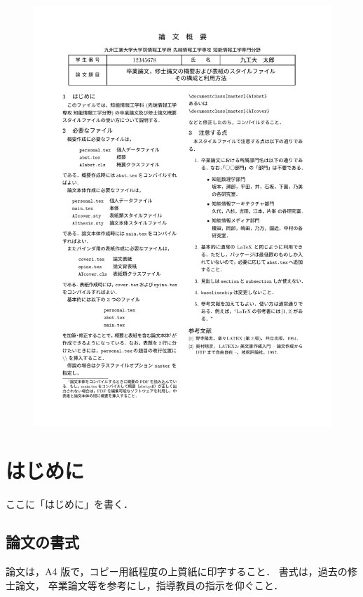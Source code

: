 \documentclass[12pt]{jreport}
\begin{document}
\makeCoverPageII
\newpage

\begin{figure}
  \centering
  \includegraphics[width=21.0cm]{abst.pdf}
\end{figure}

\restoregeometry

\pagestyle{plain}
\tableofcontents 		%
\newpage
{} 	%

\chapter{はじめに}
ここに「はじめに」を書く．

\section{論文の書式}
論文は，A4 版で，コピー用紙程度の上質紙に印字すること． 
書式は，過去の修士論文， 卒業論文等を参考にし，指導教員の指示を仰ぐこと． 
%
\end{document}
